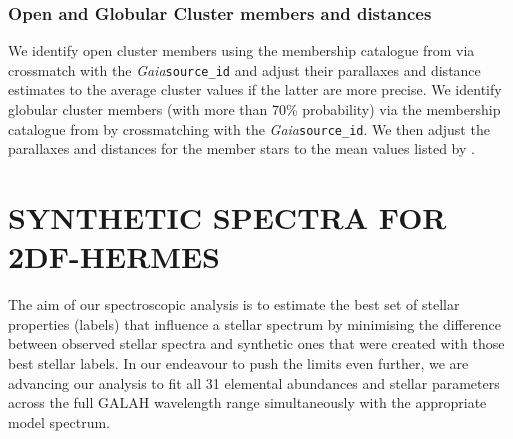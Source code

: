 \documentclass[
  journal=pasa,
  manuscript=research-paper, %
  year=2024,
  volume=37
]{cup-journal}
\newcommand{\Gaia}{\textit{Gaia}\xspace}
\begin{document}
\subsubsection{Open and Globular Cluster members and distances} \label{sec:oc_gc}

We identify open cluster members using the membership catalogue from \citet{CantatGaudin2020} via crossmatch with the \Gaia \texttt{source\_id} and adjust their parallaxes and distance estimates to the average cluster values if the latter are more precise. We identify globular cluster members (with more than 70\% probability) via the membership catalogue from \citet{Vasiliev2021} by crossmatching with the \Gaia \texttt{source\_id}. We then adjust the parallaxes and distances for the member stars to the mean values listed by \citet{Baumgardt2021}.

\section{SYNTHETIC SPECTRA FOR 2DF-HERMES}
\label{sec:synthetic_spectra}

The aim of our spectroscopic analysis is to estimate the best set of stellar properties (labels) that influence a stellar spectrum by minimising the difference between observed stellar spectra and synthetic ones that were created with those best stellar labels. In our endeavour to push the limits even further, we are advancing our analysis to fit all 31 elemental abundances and stellar parameters across the full GALAH wavelength range simultaneously with the appropriate model spectrum.
\end{document}
